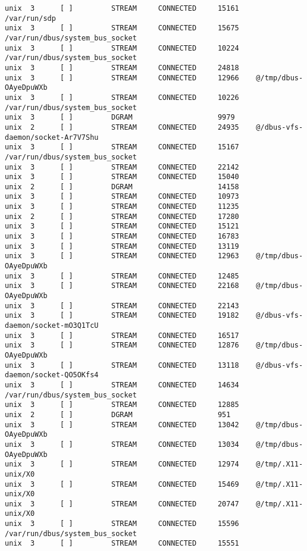 \begin{lstlisting}
unix  3      [ ]         STREAM     CONNECTED     15161    /var/run/sdp
unix  3      [ ]         STREAM     CONNECTED     15675    /var/run/dbus/system_bus_socket
unix  3      [ ]         STREAM     CONNECTED     10224    /var/run/dbus/system_bus_socket
unix  3      [ ]         STREAM     CONNECTED     24818    
unix  3      [ ]         STREAM     CONNECTED     12966    @/tmp/dbus-OAyeDpuWXb
unix  3      [ ]         STREAM     CONNECTED     10226    /var/run/dbus/system_bus_socket
unix  3      [ ]         DGRAM                    9979     
unix  2      [ ]         STREAM     CONNECTED     24935    @/dbus-vfs-daemon/socket-Ar7V7Shu
unix  3      [ ]         STREAM     CONNECTED     15167    /var/run/dbus/system_bus_socket
unix  3      [ ]         STREAM     CONNECTED     22142    
unix  3      [ ]         STREAM     CONNECTED     15040    
unix  2      [ ]         DGRAM                    14158    
unix  3      [ ]         STREAM     CONNECTED     10973    
unix  3      [ ]         STREAM     CONNECTED     11235    
unix  2      [ ]         STREAM     CONNECTED     17280    
unix  3      [ ]         STREAM     CONNECTED     15121    
unix  3      [ ]         STREAM     CONNECTED     16783    
unix  3      [ ]         STREAM     CONNECTED     13119    
unix  3      [ ]         STREAM     CONNECTED     12963    @/tmp/dbus-OAyeDpuWXb
unix  3      [ ]         STREAM     CONNECTED     12485    
unix  3      [ ]         STREAM     CONNECTED     22168    @/tmp/dbus-OAyeDpuWXb
unix  3      [ ]         STREAM     CONNECTED     22143    
unix  3      [ ]         STREAM     CONNECTED     19182    @/dbus-vfs-daemon/socket-mO3Q1TcU
unix  3      [ ]         STREAM     CONNECTED     16517    
unix  3      [ ]         STREAM     CONNECTED     12876    @/tmp/dbus-OAyeDpuWXb
unix  3      [ ]         STREAM     CONNECTED     13118    @/dbus-vfs-daemon/socket-QO5OKfs4
unix  3      [ ]         STREAM     CONNECTED     14634    /var/run/dbus/system_bus_socket
unix  3      [ ]         STREAM     CONNECTED     12885    
unix  2      [ ]         DGRAM                    951      
unix  3      [ ]         STREAM     CONNECTED     13042    @/tmp/dbus-OAyeDpuWXb
unix  3      [ ]         STREAM     CONNECTED     13034    @/tmp/dbus-OAyeDpuWXb
unix  3      [ ]         STREAM     CONNECTED     12974    @/tmp/.X11-unix/X0
unix  3      [ ]         STREAM     CONNECTED     15469    @/tmp/.X11-unix/X0
unix  3      [ ]         STREAM     CONNECTED     20747    @/tmp/.X11-unix/X0
unix  3      [ ]         STREAM     CONNECTED     15596    /var/run/dbus/system_bus_socket
unix  3      [ ]         STREAM     CONNECTED     15551    

\end{lstlisting}
